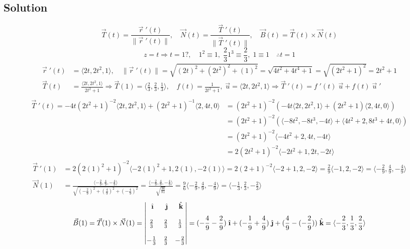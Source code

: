 \documentclass{article}
\newcommand{\ihat}{\;\hat{\textbf{\i}}}
\newcommand{\jhat}{\;\hat{\textbf{\j}}}
\newcommand{\khat}{\;\hat{\textbf{k}}}
\newcommand{\drvec}{\vec{r}\;'(t)}
\newcommand\vv[1]{\langle #1 \rangle}
\newcommand\vc[2]{\vec{#1}(#2)}
\newcommand\vcd[2]{\vec{#1}\;'(#2)}
\newcommand\mgv[1]{\|#1\|}
\newcommand\mgvvv[3]{\sqrt{\left(#1\right)^2 + \left(#2\right)^2 + \left(#3\right)^2}}
\begin{document}
\subsection*{Solution}
\[
    \vc T t = \frac{\drvec}{\|\drvec\|}, \quad \vc N t = \frac{\vec T\;'(t)}{\|\vec T\;'(t)\|}, \quad \vc B t = \vc T t \times \vc N t
\]
\[
    z = t \Rightarrow t = 1?, \quad 1^2 \equiv 1,\; \frac 2 3 1^3 \equiv \frac 2 3,\; 1 \equiv 1 \quad \therefore t= 1
\]
\begin{align*}
    \vcd r t &= \vv{2t, 2t^2, 1}, \quad \mgv{\vcd r t} = \mgvvv{2t}{2t^2}{1} = \sqrt{4t^2 + 4t^4 + 1} = \sqrt{(2t^2 + 1)^2} = 2t^2 + 1 \\
    \vc T t &= \frac{\vv{2t, 2t^2, 1}}{2t^2+1} \Rightarrow \vc T 1 = \vv{\frac 2 3, \frac 2 3, \frac 1 3}, \quad f(t) = \frac{1}{2t^2 + 1}, \; \vec u = \vv{2t, 2t^2, 1} \Rightarrow \vcd T t = f\;'(t)\;\vec u + f(t)\;\vec u\;' \\
\end{align*}
\begin{align*}
    \vcd T t = -4t(2t^2+1)^{-2}\vv{2t,2t^2,1} + (2t^2+1)^{-1}\vv{2,4t,0} &= (2t^2+1)^{-2}(-4t\vv{2t, 2t^2, 1}+(2t^2+1)\vv{2,4t,0}) \\
             &= (2t^2+1)^{-2}(\vv{-8t^2,-8t^3,-4t}+\vv{4t^2+2,8t^3+4t,0}) \\
             &= (2t^2 + 1)^{-2}\vv{-4t^2 + 2, 4t, -4t} \\
             &= 2(2t^2+1)^{-2}\vv{-2t^2+1, 2t, -2t} 
\end{align*}
\begin{align*}
    \vcd T 1 &= 2(2(1)^2+1)^{-2}\vv{-2(1)^2+1, 2(1), -2(1)} = 2(2+1)^{-2}\vv{-2+1, 2, -2} = \frac 2 9 \vv{-1, 2, -2} = \vv{-\frac{2}{9}, \frac 4 9, -\frac 4 9} \\
    \vc N 1 &= \frac{\vv{-\frac 2 9, \frac 4 9, -\frac 4 9 }}{\mgvvv{-\frac 2 9}{\frac 4 9}{-\frac 4 9}} = \frac{\vv{-\frac 2 9, \frac 4 9, -\frac 4 9 }}{\sqrt{\frac{36}{81}}} = \frac 9 6\vv{-\frac 2 9, \frac 4 9, -\frac 4 9} = \vv{-\frac 1 3, \frac 2 3, -\frac 2 3}
\end{align*}
\begin{align*}
    \vc B 1 = \vc T 1 \times \vc N 1 =
    \begin{vmatrix}
        \ihat & \jhat & \khat \\ 
        \\
        \frac 2 3 & \frac 2 3 & \frac 1 3 \\ 
        \\
        -\frac 1 3 & \frac 2 3 & -\frac 2 3
    \end{vmatrix} = (-\frac 4 9 - \frac 2 9)\ihat + (-\frac 1 9 + \frac 4 9)\jhat + (\frac 4 9 - (-\frac 2 9))\khat = \vv{-\frac 2 3, \frac 1 3, \frac 2 3}
\end{align*}
\end{document}
